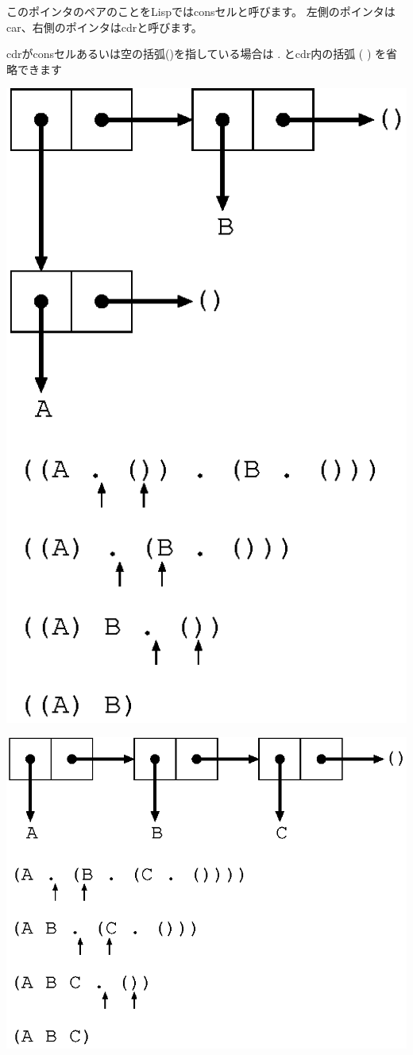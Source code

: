 \documentclass[mingoth,a4paper]{jsarticle}
\begin{document}
このポインタのペアのことをLispではconsセルと呼びます。
左側のポインタはcar、右側のポインタはcdrと呼びます。

cdrがconsセルあるいは空の括弧()を指している場合は . とcdr内の括弧 ( ) を省略できます

\includegraphics[scale=0.5]{image200903/red-pairs.eps}

\includegraphics[scale=0.5]{image200903/red-lpair.eps}
\end{document}
